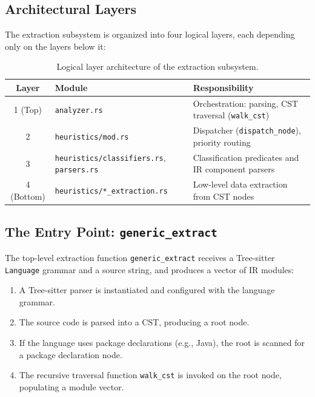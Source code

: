 \subsection{Architectural Layers}

The extraction subsystem is organized into four logical layers, each depending only on the layers below it:

\begin{table}[htpb]
  \centering
  \begin{tabular}{|c|l|l|}
    \hline
    \textbf{Layer} & \textbf{Module} & \textbf{Responsibility} \\ \hline
    1 (Top) & \texttt{analyzer.rs} & Orchestration: parsing, CST traversal (\texttt{walk\_cst}) \\ \hline
    2 & \texttt{heuristics/mod.rs} & Dispatcher (\texttt{dispatch\_node}), priority routing \\ \hline
    3 & \texttt{heuristics/classifiers.rs}, \texttt{parsers.rs} & Classification predicates and IR component parsers \\ \hline
    4 (Bottom) & \texttt{heuristics/*\_extraction.rs} & Low-level data extraction from CST nodes \\ \hline
  \end{tabular}
  \caption{Logical layer architecture of the extraction subsystem.}
  \label{tab:extraction_layers}
\end{table}

\subsection{The Entry Point: \texttt{generic\_extract}}

The top-level extraction function \texttt{generic\_extract} receives a Tree-sitter \texttt{Language} grammar and a source string, and produces a vector of IR modules:
\begin{enumerate}
  \item A Tree-sitter parser is instantiated and configured with the language grammar.
  \item The source code is parsed into a CST, producing a root node.
  \item If the language uses package declarations (e.g., Java), the root is scanned for a package declaration node.
  \item The recursive traversal function \texttt{walk\_cst} is invoked on the root node, populating a module vector.
\end{enumerate}

